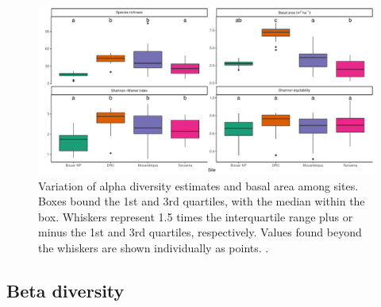 \documentclass[diversity,article,submit,moreauthors,pdftex]{Definitions/mdpi}
\begin{document}
\begin{figure}[H]
\centering
	\includegraphics[width=\textwidth]{img/div_box}
	\caption{Variation of alpha diversity estimates and basal area among sites. Boxes bound the 1st and 3rd quartiles, with the median within the box. Whiskers represent 1.5 times the interquartile range plus or minus the 1st and 3rd quartiles, respectively. Values found beyond the whiskers are shown individually as points. .}
    \label{div_box}
\end{figure}

\rnew{

}

\subsection{Beta diversity}
\end{document}
